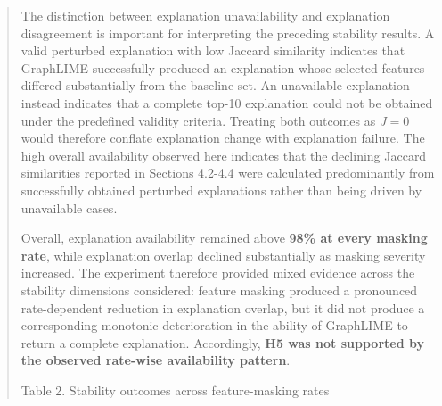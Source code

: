 \documentclass[a4paper]{article}
\begin{document}
\begin{quote}
The distinction between explanation unavailability and explanation
disagreement is important for interpreting the preceding stability
results. A valid perturbed explanation with low Jaccard similarity
indicates that GraphLIME successfully produced an explanation whose
selected features differed substantially from the baseline set. An
unavailable explanation instead indicates that a complete top-10
explanation could not be obtained under the predefined validity
criteria. Treating both outcomes as \(J = 0\) would therefore conflate
explanation change with explanation failure. The high overall
availability observed here indicates that the declining Jaccard
similarities reported in Sections 4.2-4.4 were calculated predominantly
from successfully obtained perturbed explanations rather than being
driven by unavailable cases.

Overall, explanation availability remained above \textbf{98\% at every
masking rate}, while explanation overlap declined substantially as
masking severity increased. The experiment therefore provided mixed
evidence across the stability dimensions considered: feature masking
produced a pronounced rate-dependent reduction in explanation overlap,
but it did not produce a corresponding monotonic deterioration in the
ability of GraphLIME to return a complete explanation. Accordingly,
\textbf{H5 was not supported by the observed rate-wise availability
pattern}.

Table 2. Stability outcomes across feature-masking rates
\end{quote}
\end{document}
